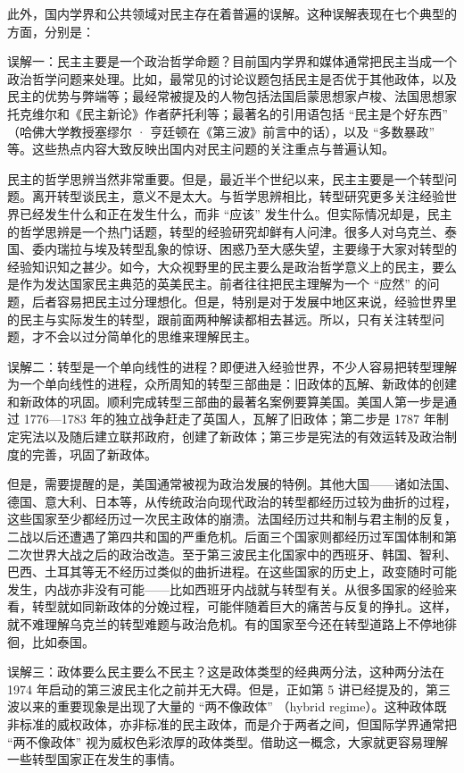 此外，国内学界和公共领域对民主存在着普遍的误解。这种误解表现在七个典型的方面，分别是：

误解一：民主主要是一个政治哲学命题？目前国内学界和媒体通常把民主当成一个政治哲学问题来处理。比如，最常见的讨论议题包括民主是否优于其他政体，以及民主的优势与弊端等；最经常被提及的人物包括法国启蒙思想家卢梭、法国思想家托克维尔和《民主新论》作者萨托利等；最著名的引用语包括 “民主是个好东西” （哈佛大学教授塞缪尔 · 亨廷顿在《第三波》前言中的话），以及 “多数暴政” 等。这些热点内容大致反映出国内对民主问题的关注重点与普遍认知。

民主的哲学思辨当然非常重要。但是，最近半个世纪以来，民主主要是一个转型问题。离开转型谈民主，意义不是太大。与哲学思辨相比，转型研究更多关注经验世界已经发生什么和正在发生什么，而非 “应该” 发生什么。但实际情况却是，民主的哲学思辨是一个热门话题，转型的经验研究却鲜有人问津。很多人对乌克兰、泰国、委内瑞拉与埃及转型乱象的惊讶、困惑乃至大感失望，主要缘于大家对转型的经验知识知之甚少。如今，大众视野里的民主要么是政治哲学意义上的民主，要么是作为发达国家民主典范的英美民主。前者往往把民主理解为一个 “应然” 的问题，后者容易把民主过分理想化。但是，特别是对于发展中地区来说，经验世界里的民主与实际发生的转型，跟前面两种解读都相去甚远。所以，只有关注转型问题，才不会以过分简单化的思维来理解民主。

误解二：转型是一个单向线性的进程？即便进入经验世界，不少人容易把转型理解为一个单向线性的进程，众所周知的转型三部曲是：旧政体的瓦解、新政体的创建和新政体的巩固。顺利完成转型三部曲的最著名案例要算美国。美国人第一步是通过 1776—1783 年的独立战争赶走了英国人，瓦解了旧政体；第二步是 1787 年制定宪法以及随后建立联邦政府，创建了新政体；第三步是宪法的有效运转及政治制度的完善，巩固了新政体。

但是，需要提醒的是，美国通常被视为政治发展的特例。其他大国——诸如法国、德国、意大利、日本等，从传统政治向现代政治的转型都经历过较为曲折的过程，这些国家至少都经历过一次民主政体的崩溃。法国经历过共和制与君主制的反复，二战以后还遭遇了第四共和国的严重危机。后面三个国家则都经历过军国体制和第二次世界大战之后的政治改造。至于第三波民主化国家中的西班牙、韩国、智利、巴西、土耳其等无不经历过类似的曲折进程。在这些国家的历史上，政变随时可能发生，内战亦非没有可能——比如西班牙内战就与转型有关。从很多国家的经验来看，转型就如同新政体的分娩过程，可能伴随着巨大的痛苦与反复的挣扎。这样，就不难理解乌克兰的转型难题与政治危机。有的国家至今还在转型道路上不停地徘徊，比如泰国。

误解三：政体要么民主要么不民主？这是政体类型的经典两分法，这种两分法在 1974 年启动的第三波民主化之前并无大碍。但是，正如第 5 讲已经提及的，第三波以来的重要现象是出现了大量的 “两不像政体” （hybrid regime）。这种政体既非标准的威权政体，亦非标准的民主政体，而是介于两者之间，但国际学界通常把 “两不像政体” 视为威权色彩浓厚的政体类型。借助这一概念，大家就更容易理解一些转型国家正在发生的事情。

